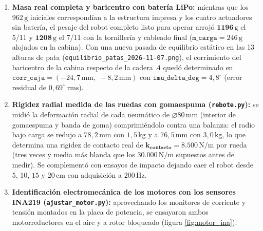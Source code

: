 \documentclass[11pt,a4paper]{report}
\newcommand{\ud}[1]{\,\mathrm{#1}}
\begin{document}
\begin{enumerate}[leftmargin=1.6em]
\item \textbf{Masa real completa y baricentro con batería LiPo:} mientras que los $962\ud{g}$
      iniciales correspondían a la estructura impresa y los cuatro actuadores sin batería, el
      pesaje del robot completo listo para operar arrojó $\mathbf{1196\ud{g}}$ el 5/11 y
      $\mathbf{1208\ud{g}}$ el 7/11 con la tornillería y cableado final ($\texttt{m\_carga} = 246\ud{g}$
      alojados en la cabina). Con una nueva pasada de equilibrio estático en las 13 alturas de
      pata (\texttt{equilibrio\_patas\_2026-11-07.png}), el corrimiento del baricentro de la
      cabina respecto de la cadera $A$ quedó determinado en $\texttt{corr\_caja} = (-24{,}7\ud{mm},\; -8{,}2\ud{mm})$
      con $\texttt{imu\_delta\_deg} = 4{,}8^\circ$ (error residual de $0{,}69^\circ\;\text{rms}$).
\item \textbf{Rigidez radial medida de las ruedas con gomaespuma (\texttt{rebote.py}):} se
      midió la deformación radial de cada neumático de $\varnothing 80\ud{mm}$ (interior de
      gomaespuma y banda de goma) comprimiéndolo contra una balanza: el radio bajo carga se
      redujo a $78{,}2\ud{mm}$ con $1{,}5\ud{kg}$ y a $76{,}5\ud{mm}$ con $3{,}0\ud{kg}$, lo que
      determina una rigidez de contacto real de $\mathbf{k_{\text{contacto}} = 8.500\ud{N/m}}$
      por rueda (tres veces y media más blanda que los $30.000\ud{N/m}$ supuestos antes de
      medir). Se complementó con ensayos de impacto dejando caer el robot desde $5$, $10$, $15$ y
      $20\ud{cm}$ con adquisición a $200\ud{Hz}$.
\item \textbf{Identificación electromecánica de los motores con los sensores INA219 (\texttt{ajustar\_motor.py}):}
      aprovechando los monitores de corriente y tensión montados en la placa de potencia, se
      ensayaron ambos motorreductores en el aire y a rotor bloqueado (figura \ref{fig:motor_ina}):
\end{enumerate}
\end{document}
